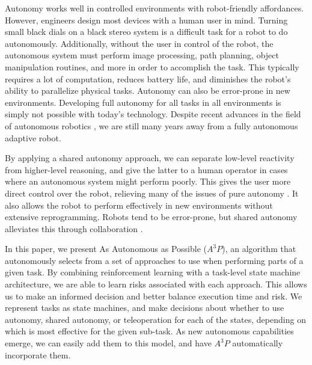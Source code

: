 \documentclass[letterpaper, 10 pt, conference]{ieeeconf}  %
\begin{document}
Autonomy works well in controlled environments with robot-friendly affordances. However, engineers design most devices with a human user in mind. Turning small black dials on a black stereo system is a difficult task for a robot to do autonomously. Additionally, without the user in control of the robot, the autonomous system must perform image processing, path planning, object manipulation routines, and more in order to accomplish the task. This typically requires a lot of computation, reduces battery life, and diminishes the robot's ability to parallelize physical tasks. Autonomy can also be error-prone in new environments. Developing full autonomy for all tasks in all environments is simply not possible with today's technology. Despite recent advances in the field of autonomous robotics \cite{darpa, 6343870, 5980259}, we are still many years away from a fully autonomous adaptive robot.

By applying a shared autonomy approach, we can separate low-level reactivity from higher-level reasoning, and give the latter to a human operator in cases where an autonomous system might perform poorly. This gives the user more direct control over the robot, relieving many of the issues of pure autonomy \cite{Goodrich:2007:HIS:1348099.1348100}. It also allows the robot to perform effectively in new environments without extensive reprogramming. Robots tend to be error-prone, but shared autonomy alleviates this through collaboration \cite{5980259}. 


In this paper, we present As Autonomous as Possible ($A^3P$), an algorithm that autonomously selects from a set of approaches to use when performing parts of a given task. By combining reinforcement learning with a task-level state machine architecture, we are able to learn risks associated with each approach. This allows us to make an informed decision and better balance execution time and risk. We represent tasks as state machines, and make decisions about whether to use autonomy, shared autonomy, or teleoperation for each of the states, depending on which is most effective for the given sub-task.  As new autonomous capabilities emerge, we can easily add them to this model, and have $A^3P$ automatically incorporate them.
\end{document}
